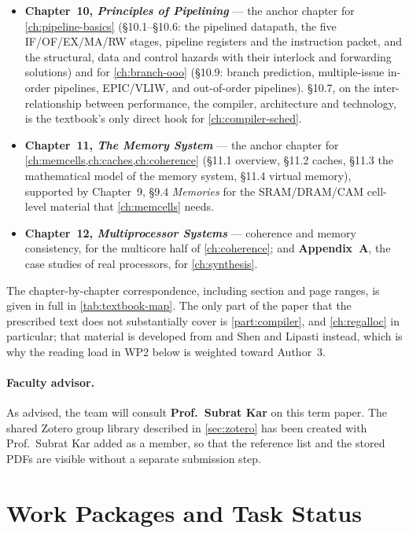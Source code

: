 \documentclass[12pt,a4paper]{report}
\begin{document}
\begin{itemize}[leftmargin=*]
  \item \textbf{Chapter~10, \emph{Principles of Pipelining}} --- the
    anchor chapter for \cref{ch:pipeline-basics} (\S10.1--\S10.6: the
    pipelined datapath, the five IF/OF/EX/MA/RW stages, pipeline
    registers and the instruction packet, and the structural, data and
    control hazards with their interlock and forwarding solutions) and
    for \cref{ch:branch-ooo} (\S10.9: branch prediction, multiple-issue
    in-order pipelines, EPIC/VLIW, and out-of-order pipelines). \S10.7,
    on the inter-relationship between performance, the compiler,
    architecture and technology, is the textbook's only direct hook for
    \cref{ch:compiler-sched}.
  \item \textbf{Chapter~11, \emph{The Memory System}} --- the anchor
    chapter for \cref{ch:memcells,ch:caches,ch:coherence} (\S11.1
    overview, \S11.2 caches, \S11.3 the mathematical model of the memory
    system, \S11.4 virtual memory), supported by Chapter~9, \S9.4
    \emph{Memories} for the SRAM/DRAM/CAM cell-level material that
    \cref{ch:memcells} needs.
  \item \textbf{Chapter~12, \emph{Multiprocessor Systems}} --- coherence
    and memory consistency, for the multicore half of
    \cref{ch:coherence}; and \textbf{Appendix~A}, the case studies of
    real processors, for \cref{ch:synthesis}.
\end{itemize}

The chapter-by-chapter correspondence, including section and page
ranges, is given in full in \cref{tab:textbook-map}. The only part of the paper that the prescribed
text does not substantially cover is \cref{part:compiler}, and
\cref{ch:regalloc} in particular; that material is developed from
\cite{hennessy} and Shen and Lipasti
\cite{shen} instead, which is why the reading load in WP2 below is
weighted toward Author~3.

\paragraph{Faculty advisor.} As advised, the team will consult
\textbf{Prof.\ Subrat Kar} on this term paper. The shared Zotero group
library described in \cref{sec:zotero} has been created with
Prof.\ Subrat Kar added as a member, so that the reference list and the
stored PDFs are visible without a separate submission step.

\section{Work Packages and Task Status}
\label{sec:workpackages}
\end{document}
